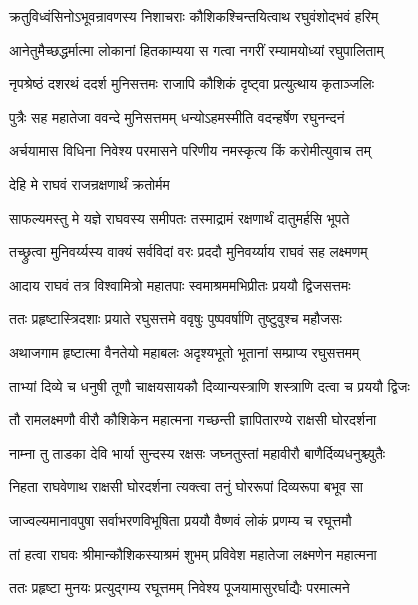 \twolineshloka
{क्रतुविध्वंसिनोऽभूवन्रावणस्य निशाचराः}
{कौशिकश्चिन्तयित्वाथ रघुवंशोद्भवं हरिम्}%

\twolineshloka
{आनेतुमैच्छद्धर्मात्मा लोकानां हितकाम्यया}
{स गत्वा नगरीं रम्यामयोध्यां रघुपालिताम्}%

\twolineshloka
{नृपश्रेष्ठं दशरथं ददर्श मुनिसत्तमः}
{राजापि कौशिकं दृष्ट्वा प्रत्युत्थाय कृताञ्जलिः}%

\twolineshloka
{पुत्रैः सह महातेजा ववन्दे मुनिसत्तमम्}
{धन्योऽहमस्मीति वदन्हर्षेण रघुनन्दनं}%

\twolineshloka
{अर्चयामास विधिना निवेश्य परमासने}
{परिणीय नमस्कृत्य किं करोमीत्युवाच तम्}%


\onelineshloka
{देहि मे राघवं राजन्रक्षणार्थं क्रतोर्मम}%

\twolineshloka
{साफल्यमस्तु मे यज्ञे राघवस्य समीपतः}
{तस्माद्रामं रक्षणार्थं दातुमर्हसि भूपते}%


\twolineshloka
{तच्छ्रुत्वा मुनिवर्य्यस्य वाक्यं सर्वविदां वरः}
{प्रददौ मुनिवर्य्याय राघवं सह लक्ष्मणम्}%

\twolineshloka
{आदाय राघवं तत्र विश्वामित्रो महातपाः}
{स्वमाश्रममभिप्रीतः प्रययौ द्विजसत्तमः}%

\twolineshloka
{ततः प्रहृष्टास्त्रिदशाः प्रयाते रघुसत्तमे}
{ववृषुः पुष्पवर्षाणि तुष्टुवुश्च महौजसः}%

\twolineshloka
{अथाजगाम हृष्टात्मा वैनतेयो महाबलः}
{अदृश्यभूतो भूतानां सम्प्राप्य रघुसत्तमम्}%

\twolineshloka
{ताभ्यां दिव्ये च धनुषी तूणौ चाक्षयसायकौ}
{दिव्यान्यस्त्राणि शस्त्राणि दत्वा च प्रययौ द्विजः}%

\twolineshloka
{तौ रामलक्ष्मणौ वीरौ कौशिकेन महात्मना}
{गच्छन्ती ज्ञापितारण्ये राक्षसी घोरदर्शना}%

\twolineshloka
{नाम्ना तु ताडका देवि भार्या सुन्दस्य रक्षसः}
{जघ्नतुस्तां महावीरौ बाणैर्दिव्यधनुश्च्युतैः}%

\twolineshloka
{निहता राघवेणाथ राक्षसी घोरदर्शना}
{त्यक्त्वा तनुं घोररूपां दिव्यरूपा बभूव सा}%

\twolineshloka
{जाज्वल्यमानावपुषा सर्वाभरणविभूषिता}
{प्रययौ वैष्णवं लोकं प्रणम्य च रघूत्तमौ}%

\twolineshloka
{तां हत्वा राघवः श्रीमान्कौशिकस्याश्रमं शुभम्}
{प्रविवेश महातेजा लक्ष्मणेन महात्मना}%

\twolineshloka
{ततः प्रहृष्टा मुनयः प्रत्युद्गम्य रघूत्तमम्}
{निवेश्य पूजयामासुरर्घाद्यैः परमात्मने}%


